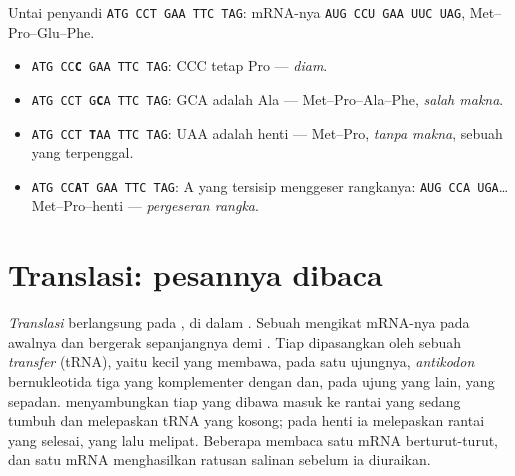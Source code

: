 \begin{example}\label{ex:g11:gene-expression:outcomes}
Untai penyandi \texttt{ATG CCT GAA TTC TAG}: mRNA-nya
\texttt{AUG CCU GAA UUC UAG},  Met--Pro--Glu--Phe.
\begin{itemize}
  \item \texttt{ATG CC\textbf{C} GAA TTC TAG}: CCC tetap Pro ---
        \emph{diam}.
  \item \texttt{ATG CCT G\textbf{C}A TTC TAG}: GCA adalah Ala ---
        Met--Pro--Ala--Phe, \emph{salah makna}.
  \item \texttt{ATG CCT \textbf{T}AA TTC TAG}: UAA adalah henti ---
        Met--Pro, \emph{tanpa makna}, sebuah  yang terpenggal.
  \item \texttt{ATG CC\textbf{A}T GAA TTC TAG}: A yang tersisip
        menggeser rangkanya: \texttt{AUG CCA UGA}\dots{} Met--Pro--henti
        --- \emph{pergeseran rangka}.
\end{itemize}
\end{example}

\section{Translasi: pesannya dibaca}

\begin{proposition}[Translasi]\label{prop:g11:gene-expression:translation}
\emph{Translasi} berlangsung pada
\emph{}, di dalam . Sebuah  mengikat mRNA-nya
pada  awalnya dan bergerak sepanjangnya  demi . Tiap
 dipasangkan oleh sebuah \emph{ transfer} (tRNA), yaitu 
kecil yang membawa, pada satu ujungnya, \emph{antikodon} bernukleotida
tiga yang komplementer dengan  dan, pada ujung yang lain,  yang sepadan.  menyambungkan tiap  yang
dibawa masuk ke rantai yang sedang tumbuh dan melepaskan tRNA yang
kosong; pada  henti ia melepaskan rantai yang selesai, yang lalu
melipat. Beberapa  membaca satu mRNA berturut-turut, dan satu
mRNA menghasilkan ratusan salinan  sebelum ia diuraikan.
\end{proposition}
\admitted

